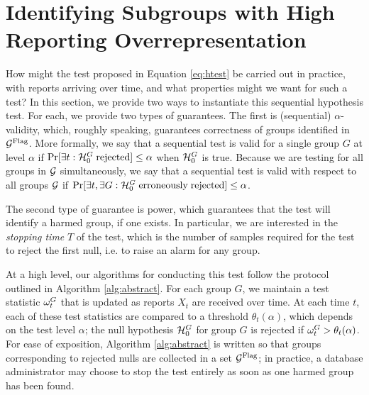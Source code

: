 \section{Identifying Subgroups with High Reporting Overrepresentation}
\label{sec:algs}

How might the test proposed in Equation \eqref{eq:htest} be carried out in practice, with reports arriving over time, and what properties might we want for such a test? In this section, we provide two ways to instantiate this sequential hypothesis test. For each, we provide two types of guarantees. The first is (sequential) $\alpha$-validity, which, roughly speaking, guarantees correctness of groups identified in ${\mathcal {G}^{\text{Flag}}}$. More formally, we say that a sequential test is valid for a single group $G$ at level $\alpha$ if $\Pr[\exists t: {\mathcal{H}_0^G} \; \mathrm{ rejected}] \leq \alpha$ when ${\mathcal{H}_0^G}$ is true. Because we are testing for all groups in $\Groups$ simultaneously, we say that a sequential test is valid with respect to all groups $\Groups$ if $\Pr[\exists t, \exists G: {\mathcal{H}_0^G} \; \mathrm{erroneously} \; \mathrm{rejected}] \leq \alpha$.

The second type of guarantee is power, which guarantees that the test will identify a harmed group, if one exists. In particular, we are interested in the \textit{stopping time} $T$ of the test, which is the number of samples required for the test to reject the first null, i.e. to raise an alarm for any group. 


At a high level, our algorithms for 
conducting this test
follow the protocol outlined in Algorithm \ref{alg:abstract}. 
\iftoggle{icml}{}{Every report $X_t$ can be considered a binary vector indexed by the groups in $\Groups$; the $G$ component of this vector is equal to $\1[X_t \in G]$. If there was only one group, we could run a sequential hypothesis test to determine whether $\mu_G$ was unacceptably large. With multiple groups, we can run $|\Groups|$ separate sequential hypothesis tests in parallel, one for each group, and correct the confidence levels for multiple hypothesis testing.}
For each group $G$, we maintain a test statistic $\omega_t^G$ that is updated as reports $X_t$ are received over time. At each time $t$, each of these test statistics are compared to a threshold $\theta_t(\alpha)$, which depends on the test level $\alpha$; the null hypothesis ${\mathcal{H}_0^G}$ for group $G$ is rejected if $\omega_t^G > \theta_t(\alpha)$. 
For ease of exposition, Algorithm \ref{alg:abstract} is written so that groups corresponding to rejected nulls are collected in a set ${\mathcal {G}^{\text{Flag}}}$; in practice, a database administrator may choose to stop the test entirely as soon as one harmed group has been found.  

